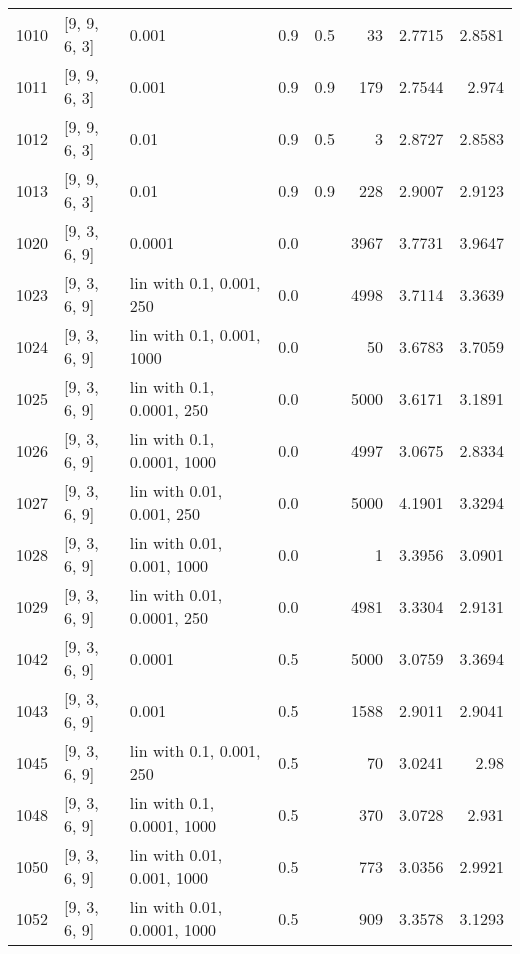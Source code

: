 \begin{longtable}{lllrrrrr}
 1010 &       [9, 9, 6, 3] &                       0.001 &      0.9 & 0.5 &   33 &   2.7715 &   2.8581 \\
 1011 &       [9, 9, 6, 3] &                       0.001 &      0.9 & 0.9 &  179 &   2.7544 &    2.974 \\
 1012 &       [9, 9, 6, 3] &                        0.01 &      0.9 & 0.5 &    3 &   2.8727 &   2.8583 \\
 1013 &       [9, 9, 6, 3] &                        0.01 &      0.9 & 0.9 &  228 &   2.9007 &   2.9123 \\
 1020 &       [9, 3, 6, 9] &                      0.0001 &      0.0 &     & 3967 &   3.7731 &   3.9647 \\
 1023 &       [9, 3, 6, 9] &    lin with 0.1, 0.001, 250 &      0.0 &     & 4998 &   3.7114 &   3.3639 \\
 1024 &       [9, 3, 6, 9] &   lin with 0.1, 0.001, 1000 &      0.0 &     &   50 &   3.6783 &   3.7059 \\
 1025 &       [9, 3, 6, 9] &   lin with 0.1, 0.0001, 250 &      0.0 &     & 5000 &   3.6171 &   3.1891 \\
 1026 &       [9, 3, 6, 9] &  lin with 0.1, 0.0001, 1000 &      0.0 &     & 4997 &   3.0675 &   2.8334 \\
 1027 &       [9, 3, 6, 9] &   lin with 0.01, 0.001, 250 &      0.0 &     & 5000 &   4.1901 &   3.3294 \\
 1028 &       [9, 3, 6, 9] &  lin with 0.01, 0.001, 1000 &      0.0 &     &    1 &   3.3956 &   3.0901 \\
 1029 &       [9, 3, 6, 9] &  lin with 0.01, 0.0001, 250 &      0.0 &     & 4981 &   3.3304 &   2.9131 \\
 1042 &       [9, 3, 6, 9] &                      0.0001 &      0.5 &     & 5000 &   3.0759 &   3.3694 \\
 1043 &       [9, 3, 6, 9] &                       0.001 &      0.5 &     & 1588 &   2.9011 &   2.9041 \\
 1045 &       [9, 3, 6, 9] &    lin with 0.1, 0.001, 250 &      0.5 &     &   70 &   3.0241 &     2.98 \\
 1048 &       [9, 3, 6, 9] &  lin with 0.1, 0.0001, 1000 &      0.5 &     &  370 &   3.0728 &    2.931 \\
 1050 &       [9, 3, 6, 9] &  lin with 0.01, 0.001, 1000 &      0.5 &     &  773 &   3.0356 &   2.9921 \\
 1052 &       [9, 3, 6, 9] & lin with 0.01, 0.0001, 1000 &      0.5 &     &  909 &   3.3578 &   3.1293 \\

\end{longtable}
